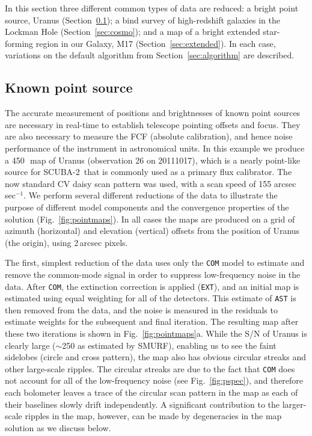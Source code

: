 \documentclass[useAMS,usenatbib,nofootinbib]{mn2e}
\newcommand{\scuba}{SCUBA-2}
\newcommand{\model}[1]{\texttt{#1}}
\begin{document}
In this section three different common types of data are reduced: a
bright point source, Uranus (Section~\ref{sec:point}); a bind survey
of high-redshift galaxies in the Lockman Hole
(Section~\ref{sec:cosmo}); and a map of a bright extended star-forming
region in our Galaxy, M17 (Section~\ref{sec:extended}). In each case,
variations on the default algorithm from Section~\ref{sec:algorithm}
are described.

\subsection{Known point source}
\label{sec:point}

The accurate measurement of positions and brightnesses of known point
sources are necessary in real-time to establish telescope pointing
offsets and focus. They are also necessary to measure the FCF
(absolute calibration), and hence noise performance of the instrument
in astronomical units.  In this example we produce a 450\,\micron\ map
of Uranus (observation 26 on 20111017), which is a nearly point-like
source for \scuba\ that is commonly used as a primary flux
calibrator. The now standard CV daisy scan pattern was used, with a
scan speed of 155 arcsec\,sec$^{-1}$. We perform several different
reductions of the data to illustrate the purpose of different model
components and the convergence properties of the solution
(Fig.~\ref{fig:pointmaps}). In all cases the maps are produced on a
grid of azimuth (horizontal) and elevation (vertical) offsets from the
position of Uranus (the origin), using 2\,arcsec pixels.

The first, simplest reduction of the data uses only the \model{COM}
model to estimate and remove the common-mode signal in order to
suppress low-frequency noise in the data. After \model{COM}, the
extinction correction is applied (\model{EXT}), and an initial map is
estimated using equal weighting for all of the detectors. This
estimate of \model{AST} is then removed from the data, and the noise
is measured in the residuals to estimate weights for the subsequent
and final iteration. The resulting map after these two iterations is
shown in Fig.~\ref{fig:pointmaps}a. While the S/N of Uranus is clearly
large ($\sim$250 as estimated by SMURF), enabling us to see the faint
sidelobes (circle and cross pattern), the map also has obvious
circular streaks and other large-scale ripples. The circular streaks
are due to the fact that \model{COM} does not account for all of the
low-frequency noise (see Fig.~\ref{fig:pspec}), and therefore each
bolometer leaves a trace of the circular scan pattern in the map as
each of their baselines slowly drift independently. A significant
contribution to the larger-scale ripples in the map, however, can be
made by degeneracies in the map solution as we discuss below.
\end{document}
